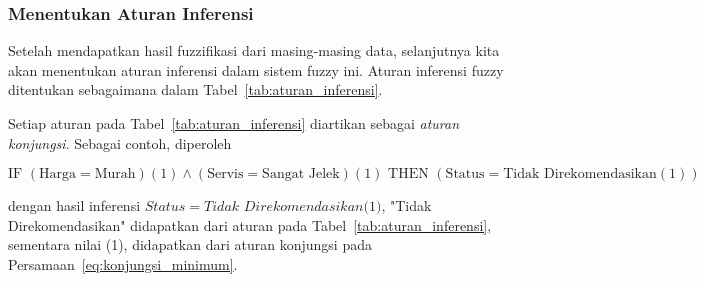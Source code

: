\documentclass[12pt,a4paper]{article}
\theoremstyle{remark}
\begin{document}
\subsubsection*{Menentukan Aturan Inferensi}

Setelah mendapatkan hasil fuzzifikasi dari masing-masing data, selanjutnya kita akan menentukan aturan inferensi dalam sistem fuzzy ini. Aturan inferensi fuzzy ditentukan sebagaimana dalam Tabel~\ref{tab:aturan_inferensi}.

\begin{table}[H]
    \centering
    \caption{Aturan Inferensi Fuzzy Berdasarkan Harga dan Kualitas Servis}
    \label{tab:aturan_inferensi}
\end{table}

Setiap aturan pada Tabel~\ref{tab:aturan_inferensi} diartikan sebagai \textit{aturan konjungsi}. Sebagai contoh, diperoleh

\[
    \text{IF } (\text{Harga} = \text{Murah})(1) \land (\text{Servis} = \text{Sangat Jelek})(1) \text{ THEN } (\text{Status} = \text{Tidak Direkomendasikan}(1))
\]

dengan hasil inferensi $Status=\textit{Tidak Direkomendasikan(1)}$, "Tidak Direkomendasikan" didapatkan dari aturan pada Tabel~\ref{tab:aturan_inferensi}, sementara nilai (1), didapatkan dari aturan konjungsi pada Persamaan~\ref{eq:konjungsi_minimum}.
\end{document}

